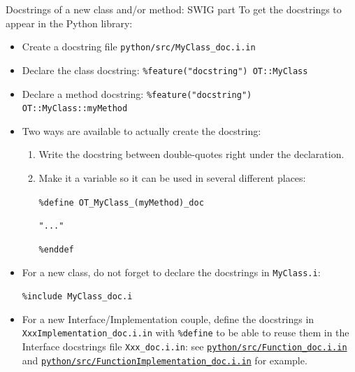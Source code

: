 \documentclass[8pt, handout]{beamer}
\begin{document}
\begin{frame}{Docstrings of a new class and/or method: SWIG part}
To get the \alert{docstrings} to appear \alert{in the Python library}:
\begin{itemize}
    \item Create a \alert{docstring file} \texttt{python/src/MyClass\_doc.i.in}
    \item Declare the \alert{class docstring}: \texttt{\%feature("docstring") OT::MyClass}
    \item Declare a \alert{method docstring}: \texttt{\%feature("docstring") OT::MyClass::myMethod}
    \item Two ways are available to actually create the docstring:
    \begin{enumerate}
        \item Write the docstring between double-quotes \alert{right under the declaration}.
        \item \alert{Make it a variable} so it can be used in several different places:

        \texttt{\%define OT\_MyClass\_(myMethod)\_doc}

        \texttt{"..."}

        \texttt{\%enddef}
    \end{enumerate}
    \item For a new class, \alert{do not forget to declare} the docstrings in \texttt{MyClass.i}:

    \texttt{\%include MyClass\_doc.i}
    \item For a new Interface/Implementation couple, define the docstrings in \texttt{XxxImplementation\_doc.i.in} with \alert{\texttt{\%define}} to be able to reuse them in the Interface docstrings file \texttt{Xxx\_doc.i.in}: see \href{https://github.com/openturns/openturns/blob/master/python/src/Function_doc.i.in}{\texttt{python/src/Function\_doc.i.in}} and \href{https://github.com/openturns/openturns/blob/master/python/src/FunctionImplementation_doc.i.in}{\texttt{python/src/FunctionImplementation\_doc.i.in}} for example.
\end{itemize}
\end{frame}
\end{document}
